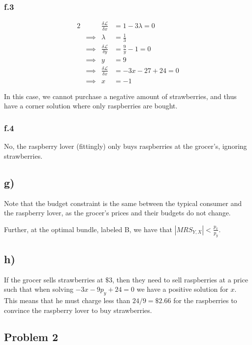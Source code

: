 \documentclass[12pt,letterpaper]{article}
\theoremstyle{definition}
\newcommand{\Lag}{\mathcal{L}}
\begin{document}
\subsubsection*{f.3}

\begin{alignat*}{2}
    && \frac{\delta \Lag}{\delta x} &= 1 - 3\lambda = 0 \\
    &\implies& \lambda &= \frac{1}{3} \\
    &\implies& \frac{\delta \Lag}{\delta y} &= \frac{9}{y} - 1 = 0 \\
    &\implies& y &= 9 \\
    &\implies& \frac{\delta \Lag}{\delta x} &= -3x -27 +24 = 0\\
    &\implies& x &= -1
\end{alignat*}

In this case, we cannot purchase a negative amount of strawberries, and thus have a
corner solution where only raspberries are bought.

\subsubsection*{f.4}

No, the raspberry lover (fittingly) only buys raspberries at the grocer's,
ignoring strawberries.

\subsection*{g)}

Note that the budget constraint is the same between the typical consumer and
the raspberry lover, as the grocer's prices and their budgets do not change.

Further, at the optimal bundle, labeled B, we have that $|MRS_{Y,X}| < \frac{p_x}{p_y}$.

\subsection*{h)}

If the grocer sells strawberries at $\$3$, then they need to sell raspberries at a
price such that when solving $-3x - 9p_y + 24 = 0$ we have a positive solution for $x$.
This means that he must charge less than $24/9 = \$2.66$ for the raspberries to
convince the raspberry lover to buy strawberries.

\subsection*{Problem 2}
\end{document}
